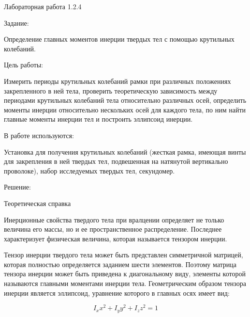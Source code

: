 \documentclass{astroedu-lab}
\begin{document}
\pagestyle{plain}

\begin{problem}{\large Лабораторная работа 1.2.4}

\begin{bfseries}
	Задание:
\end{bfseries}

Определение главных моментов инерции твердых тел с помощью крутильных колебаний.

\begin{bfseries}
	Цель работы:
\end{bfseries}

Измерить периоды крутильных колебаний рамки при различных положениях закрепленного в ней тела, проверить теоретическую зависимость между периодами крутильных колебаний тела относительно различных осей, определить моменты инерции относительно нескольких осей для каждого тела, по ним найти главные моменты инерции тел и построить эллипсоид инерции.

\begin{bfseries}
	В работе используются:
\end{bfseries}

Установка для получения крутильных колебаний (жесткая рамка, имеющая винты для закрепления в ней твердых тел, подвешенная на натянутой вертикально проволоке), набор исследуемых твердых тел, секундомер.

\begin{bfseries}
	Решение:
\end{bfseries}

\begin{bfseries}
	Теоретическая справка
\end{bfseries}

Инерционные свойства твердого тела при вралцении определяет не
только величина его массы, но и ее пространственное распределение.
Последнее характеризует физическая величина, которая называется
тензором инерции.

Тензор инерции твердого тела может быть представлен симметричной матрицей, которая полностью определяется заданием шести элементов. Поэтому матрица тензора инерции может быть приведена к диагональному виду, элементы которой называются главными моментами инерции тела. Геометрическим образом тензора инерции является эллипсоид, уравнение которого в главных осях имеет вид:

\begin{equation}
	I_x x^2 + I_y y^2 + I_z z^2 = 1
\end{equation}



\end{problem}
\end{document}
